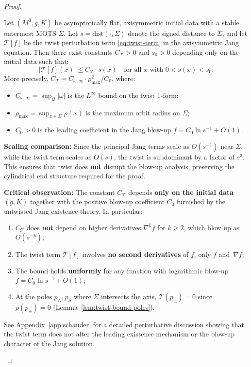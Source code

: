 \begin{proof}
\begin{lemma}\label{lem:twist-bound}
Let $(M^3, g, K)$ be asymptotically flat, axisymmetric initial data with a stable outermost MOTS $\Sigma$. Let $s = \mathrm{dist}(\cdot, \Sigma)$ denote the signed distance to $\Sigma$, and let $\mathcal{T}[f]$ be the twist perturbation term \eqref{eq:twist-term} in the axisymmetric Jang equation. Then there exist constants $C_\mathcal{T} > 0$ and $s_0 > 0$ depending only on the initial data such that:
\begin{equation}\label{eq:twist-bound-explicit}
|\mathcal{T}[f](x)| \leq C_\mathcal{T} \cdot s(x) \quad \text{for all } x \text{ with } 0 < s(x) < s_0.
\end{equation}
More precisely, $C_\mathcal{T} = C_{\omega,\infty} \cdot \rho_{\max}^2 / C_0$, where:
\begin{itemize}
    \item $C_{\omega,\infty} = \sup_{\mathcal{Q}} |\omega|$ is the $L^\infty$ bound on the twist 1-form;
    \item $\rho_{\max} = \sup_{x \in \Sigma} \rho(x)$ is the maximum orbit radius on $\Sigma$;
    \item $C_0 > 0$ is the leading coefficient in the Jang blow-up $f = C_0 \ln s^{-1} + O(1)$.
\end{itemize}

\textbf{Scaling comparison:} Since the principal Jang terms scale as $O(s^{-1})$ near $\Sigma$, while the twist term scales as $O(s)$, the twist is subdominant by a factor of $s^2$. This ensures that twist does \textbf{not} disrupt the blow-up analysis, preserving the cylindrical end structure required for the proof.

\textbf{Critical observation:} The constant $C_\mathcal{T}$ depends \textbf{only on the initial data} $(g, K)$ together with the positive blow-up coefficient $C_0$ furnished by the untwisted Jang existence theory. In particular:
\begin{enumerate}[label=\textup{(\alph*)}]
    \item $C_\mathcal{T}$ does \textbf{not} depend on higher derivatives $\nabla^k f$ for $k \geq 2$, which blow up as $O(s^{-k})$;
    \item The twist term $\mathcal{T}[f]$ involves \textbf{no second derivatives} of $f$, only $f$ and~$\nabla f$;
    \item The bound holds \textbf{uniformly} for any function with logarithmic blow-up $f = C_0 \ln s^{-1} + O(1)$;
    \item At the poles $p_N, p_S$ where $\Sigma$ intersects the axis, $\mathcal{T}(p_\pm) = 0$ since $\rho(p_\pm) = 0$ (Lemma~\ref{lem:twist-bound-poles}).
\end{enumerate}
See Appendix~\ref{app:schauder} for a detailed perturbative discussion showing that the twist term does not alter the leading existence mechanism or the blow-up character of the Jang solution.


\end{lemma}
\end{proof}
